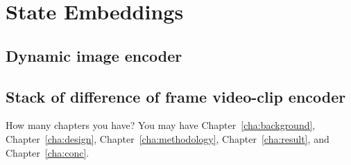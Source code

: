 \chapter{State Embeddings}
\label{cha:intro}

\section{Dynamic image encoder}


\section{Stack of difference of frame video-clip encoder}

How many chapters you have? You may have Chapter~\ref{cha:background},
Chapter~\ref{cha:design}, Chapter~\ref{cha:methodology},
Chapter~\ref{cha:result}, and Chapter~\ref{cha:conc}.
